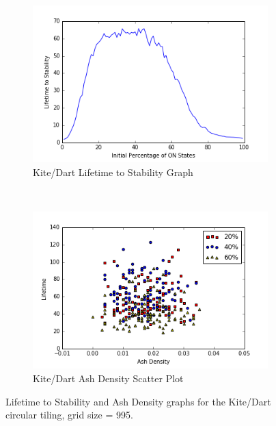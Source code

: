 \documentclass[a4paper,11pt]{report}
\begin{document}
\begin{figure}[htp]
\centering
\begin{subfigure}[t]{0.6\textwidth}
	\centering
	\includegraphics[width=\textwidth]{ch4_figs/ckd_lifetime}
	\caption{Kite/Dart Lifetime to Stability Graph}
\end{subfigure}
~
\begin{subfigure}[t]{0.6\textwidth}
	\centering
	\includegraphics[width=\textwidth]{ch4_figs/ckd_ash_density}
	\caption{Kite/Dart Ash Density Scatter Plot}
\end{subfigure}

\caption[Kite/Dart Lifetime and Ash Density Graphs]{
	Lifetime to Stability and Ash Density graphs for the Kite/Dart circular tiling, grid size = 995. 
}
\label{fig:ckd_lifetime_density}
\end{figure}
\end{document}
